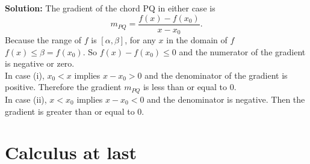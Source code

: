 \documentclass{article}
\newcommand{\solution}[1]{\setlength{\hangindent}{\parindent} \indent\indent \textbf{Solution: }#1\hfill\break}
\begin{document}
\solution{The gradient of the chord PQ in either case is
$$m_{PQ}= \frac{f(x) - f(x_0)}{x-x_0}.$$ 
\indent Because the range of $f$ is $[\alpha, \beta]$, for any $x$ in the domain of $f$ $f(x) \leqslant \beta = f(x_0)$. So $f(x) - f(x_0) \leqslant 0$ and the numerator of the gradient is negative or zero.\\
\indent In case (i), $x_0 < x$ implies $x-x_0>0$ and the denominator of the gradient is positive. Therefore the gradient $m_{PQ}$ is less than or equal to 0. \\
\indent In case (ii), $x < x_0$ implies $x-x_0<0$ and the denominator is negative. Then the gradient is greater than or equal to 0.} %

\newpage
\section{Calculus at last} 
\end{document}
